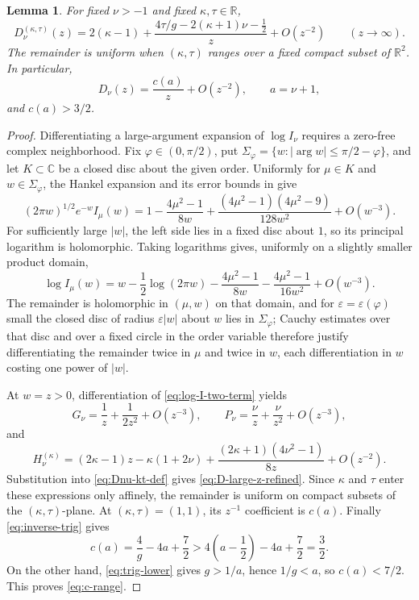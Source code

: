\documentclass[11pt,a4paper]{amsart}
\numberwithin{equation}{section}
\theoremstyle{plain}
\newtheorem{lemma}[theorem]{Lemma}
\theoremstyle{definition}
\newcommand{\R}{\mathbb R}
\begin{document}
\begin{lemma}\label{lem:large-argument-limit}
For fixed \(\nu>-1\) and fixed \(\kappa,\tau\in\R\),
\begin{equation}\label{eq:D-large-z-refined}
 D_\nu^{(\kappa,\tau)}(z)
 =2(\kappa-1)
 +\frac{4\tau/g-2(\kappa+1)\nu-\frac12}{z}
 +O(z^{-2})
 \qquad(z\to\infty).
\end{equation}
The remainder is uniform when \((\kappa,\tau)\) ranges over a fixed compact
subset of \(\R^2\).  In particular,
\begin{equation}\label{eq:D-endpoint-tail}
 D_\nu(z)=\frac{c(a)}z+O(z^{-2}),
 \qquad a=\nu+1,
\end{equation}
and \(c(a)>3/2\).
\end{lemma}

\begin{proof}
Differentiating a large-argument expansion of \(\log I_\nu\) requires a
zero-free complex neighborhood.  Fix \(\varphi\in(0,\pi/2)\), put
\(\Sigma_\varphi=\{w:|\arg w|\le\pi/2-\varphi\}\), and let \(K\subset\mathbb C\)
be a closed disc about the given order.  Uniformly for \(\mu\in K\) and
\(w\in\Sigma_\varphi\), the Hankel expansion and its error bounds in
\cite[eqs.~10.17.1 and 10.40.1, \S10.40(iii)]{NISTDLMFBessel} give
\[
 (2\pi w)^{1/2}e^{-w}I_\mu(w)
 =1-\frac{4\mu^2-1}{8w}
 +\frac{(4\mu^2-1)(4\mu^2-9)}{128w^2}
 +O(w^{-3}).
\]
For sufficiently large \(|w|\), the left side lies in a fixed disc about \(1\),
so its principal logarithm is holomorphic.  Taking logarithms gives, uniformly
on a slightly smaller product domain,
\begin{equation}\label{eq:log-I-two-term}
 \log I_\mu(w)
 =w-\frac12\log(2\pi w)
 -\frac{4\mu^2-1}{8w}
 -\frac{4\mu^2-1}{16w^2}
 +O(w^{-3}).
\end{equation}
The remainder is holomorphic in \((\mu,w)\) on that domain, and for
\(\varepsilon=\varepsilon(\varphi)\) small the closed disc of radius
\(\varepsilon|w|\) about \(w\) lies in \(\Sigma_\varphi\); Cauchy
estimates over that disc and over a fixed circle in the order variable
therefore justify differentiating the remainder twice in \(\mu\) and twice in
\(w\), each differentiation in \(w\) costing one power of \(|w|\).

At \(w=z>0\), differentiation of \eqref{eq:log-I-two-term} yields
\[
 G_\nu=\frac1z+\frac1{2z^2}+O(z^{-3}),\qquad
 P_\nu=\frac\nu z+\frac\nu{z^2}+O(z^{-3}),
\]
and
\[
 H_\nu^{(\kappa)}
 =(2\kappa-1)z-\kappa(1+2\nu)
 +\frac{(2\kappa+1)(4\nu^2-1)}{8z}
 +O(z^{-2}).
\]
Substitution into \eqref{eq:Dnu-kt-def} gives
\eqref{eq:D-large-z-refined}.  Since \(\kappa\) and \(\tau\) enter these
expressions only affinely, the remainder is uniform on compact subsets of the
\((\kappa,\tau)\)-plane.  At \((\kappa,\tau)=(1,1)\), its \(z^{-1}\)
coefficient is \(c(a)\).  Finally \eqref{eq:inverse-trig} gives
\[
 c(a)=\frac4g-4a+\frac72>4\left(a-\frac12\right)-4a+\frac72=\frac32.
\]
On the other hand, \eqref{eq:trig-lower} gives \(g>1/a\), hence \(1/g<a\),
so \(c(a)<7/2\).  This proves \eqref{eq:c-range}.
\end{proof}
\end{document}
